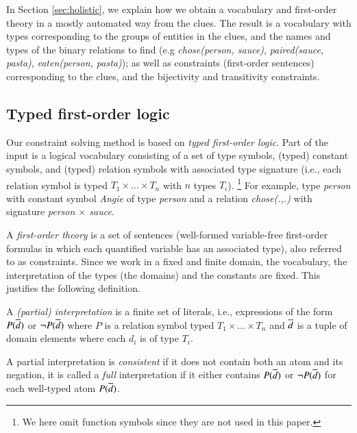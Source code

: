 In Section \ref{sec:holistic}, we explain how we obtain a vocabulary and first-order theory in a mostly automated way from the clues. 
The result is a vocabulary with types corresponding to the groups of entities in the clues, and the names and types of the binary relations to find (e.g \textit{chose(person, sauce)}, \textit{paired(sauce, pasta)}, \textit{eaten(person, pasta)});
as well as constraints (first-order sentences) corresponding to the clues, and the bijectivity and transitivity constraints. 

\subsection{Typed first-order logic}

Our constraint solving method is based on \emph{typed first-order logic}. %
Part of the input is a logical vocabulary consisting of a set of type symbols, (typed) constant symbols, and (typed) relation symbols with associated type signature (i.e., each relation symbol is typed $T_1\times \dots \times T_n$ with $n$ types $T_i$).
\footnote{We here omit function symbols since they are not used in this paper.} 
For example, type \textit{person} with constant symbol \textit{Angie} of type \textit{person} and a relation \textit{chose(.,.)} with signature \textit{person $\times$ sauce}.


A \emph{first-order theory} is a set of sentences (well-formed variable-free first-order formulas \cite{enderton} in which each quantified variable has an associated type), also referred to as constraints.
Since we work in a fixed and finite domain, the vocabulary, the interpretation of the types (the domains) and the constants are fixed.
This justifies the following definition. 
\begin{definition}\label{def:partial-interpretation}
 A \emph{(partial) interpretation} is a finite set of literals, i.e., expressions of the form $P(\overline{d})$ or $\lnot P(\overline{d})$ where $P$ is a relation symbol typed $T_1\times\dots \times T_n$ and $\overline{d}$ is a tuple of domain elements where each $d_i$ is of type $T_i$. 
\end{definition}
 \begin{definition}\label{def:consistent}
 A partial interpretation is \emph{consistent} if it does not contain both an atom and its negation, it is called a \emph{full} interpretation if it either contains $P(\overline{d})$ or $\lnot P(\overline{d})$ for each well-typed atom $P(\overline{d})$. 
\end{definition}


